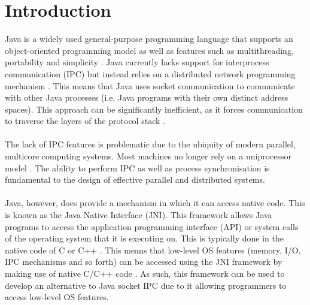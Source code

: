 \documentclass[12pt] {newrucsthesis}    %
\begin{document}
  \tableofcontents
    \newpage

  \listoffigures
    \newpage

  \listoftables
    \newpage

  \lstlistoflistings
    \newpage


  \chapter{Introduction}
      Java is a widely used general-purpose programming language that supports an object-oriented
      programming model as well as features such as multithreading, portability and simplicity \citep{JavaIntro}.
      Java currently lacks support for interprocess communication (IPC) but instead relies on a distributed network
      programming mechanism  \citep{WellsIPCMultiProc}.
      This means that Java uses socket communication to communicate with other Java processes (i.e. Java programs
      with their own distinct address spaces). This approach can be significantly inefficient, as it forces
      communication to traverse the layers of the protocol stack \citep{WellsIPCJava}.
      \\\\
      The lack of IPC features is problematic due to the ubiquity of modern parallel, multicore computing systems.
      Most machines no longer rely on a uniprocessor model \citep{hayes2007computing}.
      The ability to perform IPC as well as process synchronisation is fundamental to the design of effective
      parallel and distributed systems.
      \\\\
      Java, however, does provide a mechanism in which it can access native code. This is known as
      the Java Native Interface (JNI). This framework allows Java programs to access the application
      programming interface (API) or system calls of the operating system that it is executing on.
      This is typically done in the native code of C or C++ \citep{LiangJNISpecification}.
      This means that low-level OS features (memory, I/O, IPC mechanisms and so forth) can be accessed using the
      JNI framework by making use of native C/C++ code \citep{IBM2009}. As such, this framework can be
      used to develop an alternative to Java socket IPC due to it allowing programmers to access low-level
      OS features.
      \\\\
\end{document}

